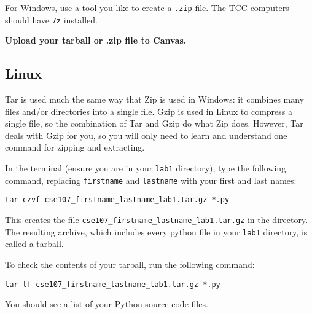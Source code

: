 \documentclass[12pt,hidelinks]{article}
\begin{document}
For Windows, use a tool you like to create a \texttt{.zip} file. The TCC computers should
have \texttt{7z} installed.

\begin{center}
  \textbf{Upload your tarball or .zip file to Canvas.}
\end{center}

\subsection{Linux}

Tar is used much the same way that Zip is used in Windows: it combines many files and/or directories into a single file. Gzip is used in Linux to compress a single file, so the combination of Tar and Gzip do what Zip does. However, Tar deals with Gzip for you, so you will only need to learn and understand one command for zipping and extracting.

In the terminal (ensure you are in your \texttt{lab1} directory), type the following command, replacing \texttt{firstname} and \texttt{lastname} with your first and last names:

\begin{lstlisting}[style=bash]
tar czvf cse107_firstname_lastname_lab1.tar.gz *.py
\end{lstlisting}

This creates the file \texttt{cse107\_firstname\_lastname\_lab1.tar.gz} in the directory. The resulting archive, which includes every python file in your \texttt{lab1} directory, is called a tarball. 

To check the contents of your tarball, run the following command:

\begin{lstlisting}[style=bash]
tar tf cse107_firstname_lastname_lab1.tar.gz *.py
\end{lstlisting}

You should see a list of your Python source code files.


\pagebreak
\end{document}
